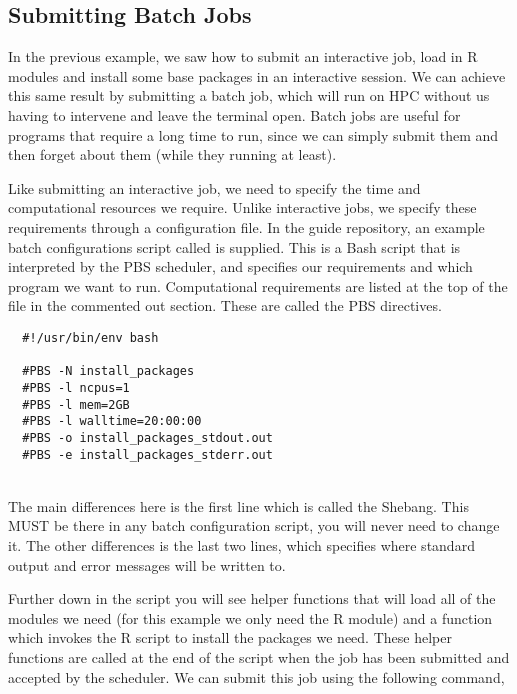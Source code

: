 \subsection{Submitting Batch Jobs}
\label{sec:batch}
In the previous example, we saw how to submit an interactive job, load in R modules and install some base packages in an interactive session. We can achieve this same result by submitting a batch job, which will run on HPC without us having to intervene and leave the terminal open. Batch jobs are useful for programs that require a long time to run, since we can simply submit them and then forget about them (while they running at least).
%
\par
% 
%
Like submitting an interactive job, we need to specify the time and computational resources we require. Unlike interactive jobs, we specify these requirements through a configuration file. In the guide repository, an example batch configurations script called  is supplied. This is a Bash script that is interpreted by the PBS scheduler, and specifies our requirements and which program we want to run. Computational requirements are listed at the top of the file in the commented out section. These are called the PBS directives.
\\
\par
\begin{verbatim}
  #!/usr/bin/env bash

  #PBS -N install_packages
  #PBS -l ncpus=1
  #PBS -l mem=2GB
  #PBS -l walltime=20:00:00
  #PBS -o install_packages_stdout.out
  #PBS -e install_packages_stderr.out

\end{verbatim}
%
\\
%
The main differences here is the first line which is called the Shebang. This MUST be there in any batch configuration script, you will never need to change it. The other differences is the last two lines, which specifies where standard output and error messages will be written to.
%
%
\par
%
%
Further down in the script you will see helper functions that will load all of the modules we need (for this example we only need the R module) and a function which invokes the R script to install the packages we need. These helper functions are called at the end of the script when the job has been submitted and accepted by the scheduler. We can submit this job using the following command,
